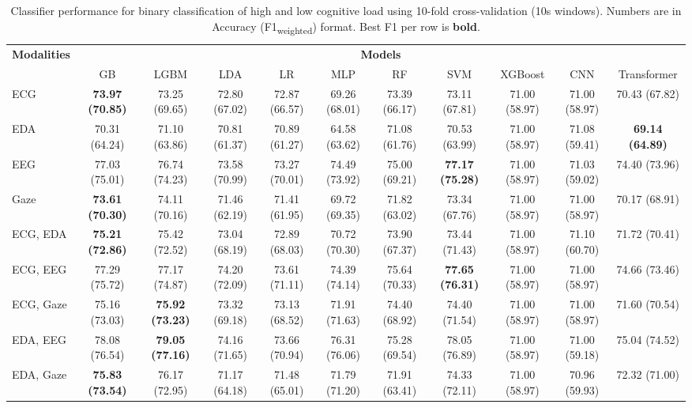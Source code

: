 \begin{table}[!htbp]
  \centering
  \scriptsize
  \setlength{\tabcolsep}{3pt}
  \caption{Classifier performance for binary classification of high and low cognitive load using 10-fold cross-validation (10s windows). Numbers are in Accuracy (F1\textsubscript{weighted}) format. Best F1 per row is \textbf{bold}.}
  \label{tab:results_10fold_10s}
  \begin{tabular}{lcccccccccc}
    \toprule
    \textbf{Modalities} & \multicolumn{10}{c}{\textbf{Models}} \\
    \cmidrule(l){2-11}
    & GB & LGBM & LDA & LR & MLP & RF & SVM & XGBoost & CNN & Transformer \\
    \midrule
    ECG & \textbf{73.97 (70.85)} & 73.25 (69.65) & 72.80 (67.02) & 72.87 (66.57) & 69.26 (68.01) & 73.39 (66.17) & 73.11 (67.81) & 71.00 (58.97) & 71.00 (58.97) & 70.43 (67.82) \\
    EDA & 70.31 (64.24) & 71.10 (63.86) & 70.81 (61.37) & 70.89 (61.27) & 64.58 (63.62) & 71.08 (61.76) & 70.53 (63.99) & 71.00 (58.97) & 71.08 (59.41) & \textbf{69.14 (64.89)} \\
    EEG & 77.03 (75.01) & 76.74 (74.23) & 73.58 (70.99) & 73.27 (70.01) & 74.49 (73.92) & 75.00 (69.21) & \textbf{77.17 (75.28)} & 71.00 (58.97) & 71.03 (59.02) & 74.40 (73.96) \\
    Gaze & \textbf{73.61 (70.30)} & 74.11 (70.16) & 71.46 (62.19) & 71.41 (61.95) & 69.72 (69.35) & 71.82 (63.02) & 73.34 (67.76) & 71.00 (58.97) & 71.00 (58.97) & 70.17 (68.91) \\
    \midrule
    ECG, EDA & \textbf{75.21 (72.86)} & 75.42 (72.52) & 73.04 (68.19) & 72.89 (68.03) & 70.72 (70.30) & 73.90 (67.37) & 73.44 (71.43) & 71.00 (58.97) & 71.10 (60.70) & 71.72 (70.41) \\
    ECG, EEG & 77.29 (75.72) & 77.17 (74.87) & 74.20 (72.09) & 73.61 (71.11) & 74.39 (74.14) & 75.64 (70.33) & \textbf{77.65 (76.31)} & 71.00 (58.97) & 71.00 (58.97) & 74.66 (73.46) \\
    ECG, Gaze & 75.16 (73.03) & \textbf{75.92 (73.23)} & 73.32 (69.18) & 73.13 (68.52) & 71.91 (71.63) & 74.40 (68.92) & 74.40 (71.54) & 71.00 (58.97) & 71.00 (58.97) & 71.60 (70.54) \\
    EDA, EEG & 78.08 (76.54) & \textbf{79.05 (77.16)} & 74.16 (71.65) & 73.66 (70.94) & 76.31 (76.06) & 75.28 (69.54) & 78.05 (76.89) & 71.00 (58.97) & 71.00 (59.18) & 75.04 (74.52) \\
    EDA, Gaze & \textbf{75.83 (73.54)} & 76.17 (72.95) & 71.17 (64.18) & 71.48 (65.01) & 71.79 (71.20) & 71.91 (63.41) & 74.33 (72.11) & 71.00 (58.97) & 70.96 (59.93) & 72.32 (71.00) \\

\end{tabular}
\end{table}

